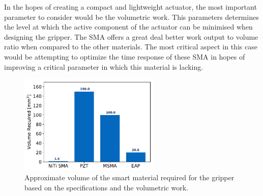 In the hopes of creating a compact and lightweight actuator, the most important parameter to consider would be the volumetric work. This parameters determines the level at which the active component of the actuator can be minimised when designing the gripper. The SMA offers a great deal better work output to volume ratio when compared to the other materials. The most critical aspect in this case would be attempting to optimize the time response of these SMA in hopes of improving a critical parameter in which this material is lacking.

\begin{figure}[H]
	\centering
	\includegraphics[width=0.6\textwidth]{Figures/Vol_Req_Bar.pdf}
	\caption{Approximate volume of the smart material required for the gripper based on the specifications and the volumetric work.}
	\label{fig:vol_req_bar}
\end{figure}
